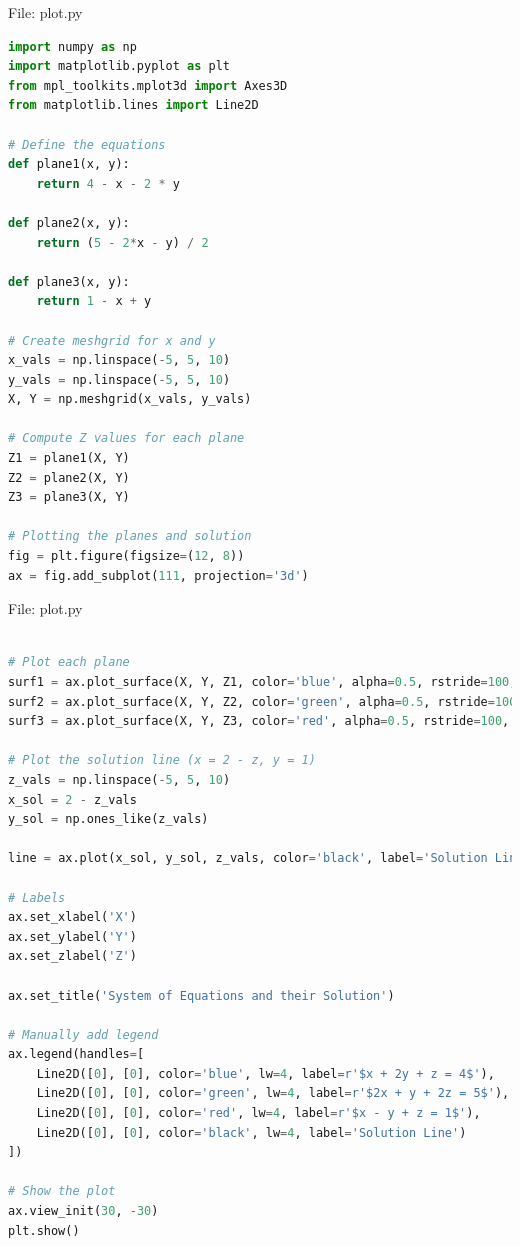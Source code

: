 \documentclass{beamer}
\numberwithin{equation}{section}
\theoremstyle{remark}
\begin{document}
\begin{frame}[fragile]{File: plot.py}
\begin{lstlisting}[language=Python]
import numpy as np
import matplotlib.pyplot as plt
from mpl_toolkits.mplot3d import Axes3D
from matplotlib.lines import Line2D

# Define the equations
def plane1(x, y):
    return 4 - x - 2 * y

def plane2(x, y):
    return (5 - 2*x - y) / 2

def plane3(x, y):
    return 1 - x + y

# Create meshgrid for x and y
x_vals = np.linspace(-5, 5, 10)
y_vals = np.linspace(-5, 5, 10)
X, Y = np.meshgrid(x_vals, y_vals)

# Compute Z values for each plane
Z1 = plane1(X, Y)
Z2 = plane2(X, Y)
Z3 = plane3(X, Y)

# Plotting the planes and solution
fig = plt.figure(figsize=(12, 8))
ax = fig.add_subplot(111, projection='3d')
\end{lstlisting}
\end{frame}

\begin{frame}[fragile]{File: plot.py}
\begin{lstlisting}[language=Python]

# Plot each plane
surf1 = ax.plot_surface(X, Y, Z1, color='blue', alpha=0.5, rstride=100, cstride=100)
surf2 = ax.plot_surface(X, Y, Z2, color='green', alpha=0.5, rstride=100, cstride=100)
surf3 = ax.plot_surface(X, Y, Z3, color='red', alpha=0.5, rstride=100, cstride=100)

# Plot the solution line (x = 2 - z, y = 1)
z_vals = np.linspace(-5, 5, 10)
x_sol = 2 - z_vals
y_sol = np.ones_like(z_vals)

line = ax.plot(x_sol, y_sol, z_vals, color='black', label='Solution Line')

# Labels
ax.set_xlabel('X')
ax.set_ylabel('Y')
ax.set_zlabel('Z')

ax.set_title('System of Equations and their Solution')

# Manually add legend
ax.legend(handles=[
    Line2D([0], [0], color='blue', lw=4, label=r'$x + 2y + z = 4$'),
    Line2D([0], [0], color='green', lw=4, label=r'$2x + y + 2z = 5$'),
    Line2D([0], [0], color='red', lw=4, label=r'$x - y + z = 1$'),
    Line2D([0], [0], color='black', lw=4, label='Solution Line')
])

# Show the plot
ax.view_init(30, -30)
plt.show()
\end{lstlisting}
\end{frame}
\end{document}

